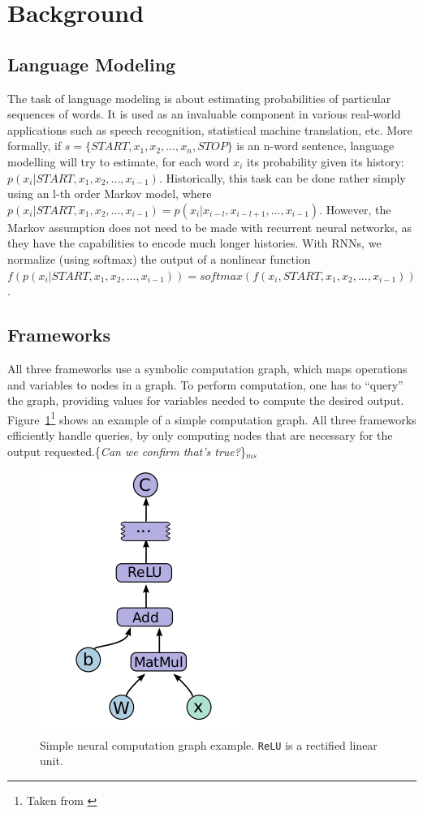 \documentclass{article}
\newcommand{\ms}[1]{{\color{cyan}\{\textit{#1}\}$_{ms}$}}
\begin{document}
\section{Background}
\subsection{Language Modeling}
The task of language modeling is about estimating probabilities of particular sequences of words. It is used as an invaluable component in various real-world applications such as speech recognition, statistical machine translation, etc. More formally, if $s=\{START,x_1,x_2,...,x_n,STOP\}$ is an n-word sentence, language modelling will try to estimate, for each word $x_i$
its probability given its history: $p(x_i|START,x_1,x_2,...,x_{i-1})$. 
Historically, this task can be done rather simply using an l-th order Markov model, where $p(x_i|START,x_1,x_2,...,x_{i-1}) = p(x_i|x_{i-l},x_{i-l+1},...,x_{i-1})$. However, the Markov assumption does not need to be made with recurrent neural networks, as they have the capabilities to encode much longer histories. With RNNs, we normalize (using softmax) the output of a nonlinear function $f\left(p(x_i|START,x_1,x_2,...,x_{i-1})\right) =softmax\left(f(x_i,START,x_1,x_2,...,x_{i-1})\right)$.

\subsection{Frameworks}
All three frameworks use a symbolic computation graph, which maps operations and variables to nodes in a graph. To perform computation, one has to ``query'' the graph, providing values for variables needed to compute the desired output.
Figure~\ref{fig:compGraph}\footnote{Taken from \cite{tensorflow}} shows an example of a simple computation graph. All three frameworks efficiently handle queries, by only computing nodes that are necessary for the output requested.\ms{Can we confirm that's true?}

\begin{figure}\begin{center}
\includegraphics[scale=.4]{graphics/tensorflowGraph.png}
\caption{\label{fig:compGraph}Simple neural computation graph example. \texttt{ReLU} is a rectified linear unit.} 
\end{center}\end{figure}
\end{document}
